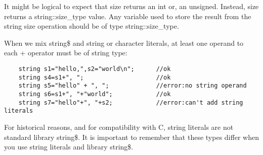 \documentclass[UTF8]{ctexart}
\newcommand \qd[1] {\begin{qds} {#1} \end{qds}}
\begin{document}
It might be logical to expect that size returns an int or, an unsigned. Instead, size returns a string::size_type value. Any variable used to store the result from the string size operation should be of type string::size_type.

When we mix string\$ and string or character literals, at least one operand to each + operator must be of string type:
\begin{lstlisting}
	string s1="hello,",s2="world\n";      //ok
	string s4=s1+", ";                    //ok
	string s5="hello" + ", ";             //error:no string operand
	string s6=s1+", "+"world";            //ok
	string s7="hello"+", "+s2;            //error:can't add string literals
\end{lstlisting}

\qd{For historical reasons, and for compatibility with C, string literals are not standard library string\$. It is important to remember that these types differ when you use string literals and library string\$.}
\end{document}
